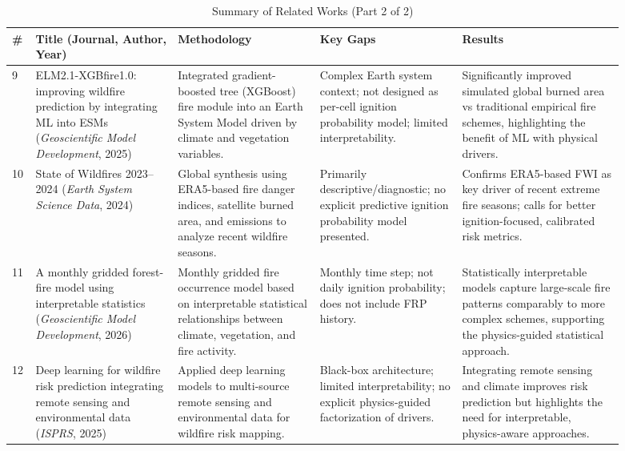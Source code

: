 \documentclass[conference]{IEEEtran}
\begin{document}
\begin{table}[t]
\caption{Summary of Related Works (Part 2 of 2)}
\label{tab:related2}
\centering
\scriptsize
\begin{tabular}{|p{0.02\linewidth}|p{0.21\linewidth}|p{0.21\linewidth}|p{0.21\linewidth}|p{0.24\linewidth}|}
\hline
\textbf{\#} & \textbf{Title (Journal, Author, Year)} & \textbf{Methodology} & \textbf{Key Gaps} & \textbf{Results} \\
\hline
9 &
ELM2.1-XGBfire1.0: improving wildfire prediction by integrating ML into ESMs
(\textit{Geoscientific Model Development}, 2025) &
Integrated gradient-boosted tree (XGBoost) fire module into an Earth System Model driven by climate and vegetation variables. &
Complex Earth system context; not designed as per-cell ignition probability model; limited interpretability. &
Significantly improved simulated global burned area vs traditional empirical fire schemes, highlighting the benefit of ML with physical drivers. \\
\hline
10 &
State of Wildfires 2023--2024
(\textit{Earth System Science Data}, 2024) &
Global synthesis using ERA5-based fire danger indices, satellite burned area, and emissions to analyze recent wildfire seasons. &
Primarily descriptive/diagnostic; no explicit predictive ignition probability model presented. &
Confirms ERA5-based FWI as key driver of recent extreme fire seasons; calls for better ignition-focused, calibrated risk metrics. \\
\hline
11 &
A monthly gridded forest-fire model using interpretable statistics
(\textit{Geoscientific Model Development}, 2026) &
Monthly gridded fire occurrence model based on interpretable statistical relationships between climate, vegetation, and fire activity. &
Monthly time step; not daily ignition probability; does not include FRP history. &
Statistically interpretable models capture large-scale fire patterns comparably to more complex schemes, supporting the physics-guided statistical approach. \\
\hline
12 &
Deep learning for wildfire risk prediction integrating remote sensing and environmental data
(\textit{ISPRS}, 2025) &
Applied deep learning models to multi-source remote sensing and environmental data for wildfire risk mapping. &
Black-box architecture; limited interpretability; no explicit physics-guided factorization of drivers. &
Integrating remote sensing and climate improves risk prediction but highlights the need for interpretable, physics-aware approaches. \\

\end{tabular}
\end{table}
\end{document}
